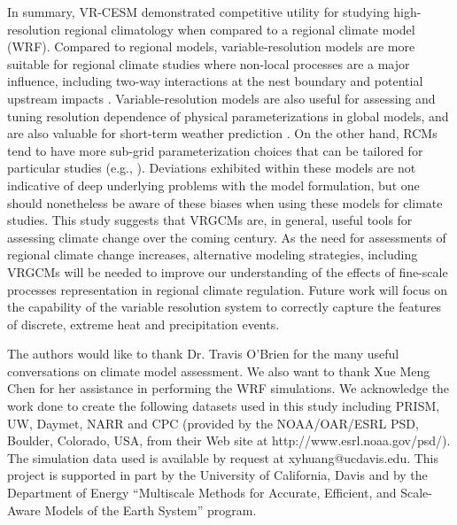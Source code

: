 \documentclass[draft,ms]{agutex}   %
\begin{document}
\begin{article}
In summary, VR-CESM demonstrated competitive utility for studying high-resolution regional climatology when compared to a regional climate model (WRF). Compared to regional models, variable-resolution models are more suitable for regional climate studies where non-local processes are a major influence, including two-way interactions at the nest boundary and potential upstream impacts \citep{sakaguchi2015exploring}.  Variable-resolution models are also useful for assessing and tuning resolution dependence of physical parameterizations in global models, and are also valuable for short-term weather prediction \citep{zarzycki2015experimental}. On the other hand, RCMs tend to have more sub-grid parameterization choices that can be tailored for particular studies (e.g., \citep{cassano2011performance}). Deviations exhibited within these models are not indicative of deep underlying problems with the model formulation, but one should nonetheless be aware of these biases when using these models for climate studies. This study suggests that VRGCMs are, in general, useful tools for assessing climate change over the coming century. As the need for assessments of regional climate change increases, alternative modeling strategies, including VRGCMs will be needed to improve our understanding of the effects of fine-scale processes representation in regional climate regulation. Future work will focus on the capability of the variable resolution system to correctly capture the features of discrete, extreme heat and precipitation events.



\begin{acknowledgments}


The authors would like to thank Dr. Travis O'Brien for the many useful conversations on climate model assessment. We also want to thank Xue Meng Chen for her assistance in performing the WRF simulations. We acknowledge the work done to create the following datasets used in this study including PRISM, UW, Daymet, NARR and CPC (provided by the NOAA/OAR/ESRL PSD, Boulder, Colorado, USA, from their Web site at http://www.esrl.noaa.gov/psd/). The simulation data used is available by request at xyhuang@ucdavis.edu. This project is supported in part by the University of California, Davis and by the Department of Energy ``Multiscale Methods for Accurate, Efficient, and Scale-Aware Models of the Earth System'' program. 
\end{acknowledgments}


\end{article}
\end{document}
